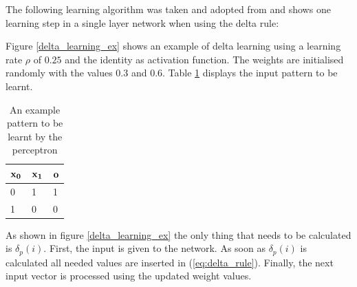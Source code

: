 The following learning algorithm was taken and adopted from \cite[p.186]{pattern} and shows one learning step in a single layer network when using the delta rule:

\begin{center}


\end{center}

Figure \ref{delta_learning_ex} shows an example of delta learning using a learning rate $\rho$ of $0.25$ and the identity as activation function. The weights are initialised randomly with the values 0.3 and 0.6. Table \ref{delta_ex_pattern} displays the input pattern to be learnt.

\begin{table}[htbp]
	\vspace{1.5em}
	\begin{center}
		\begin{tabular}{|l|l|l|}
		\hline
		$\bf{x_0}$&$\bf{x_1}$&$\bf{o}$\\
		\hline
		0&1&1\\
		\hline
		1&0&0\\
		\hline
		\end{tabular}
	\end{center}
	\vspace{-1em}
	\caption{An example pattern to be learnt by the perceptron}
	\vspace{1.5em}
	\label{delta_ex_pattern}
\end{table}

As shown in figure \ref{delta_learning_ex} the only thing that needs to be calculated is $\delta_p(i)$. First, the input is given to the network. As soon as $\delta_p(i)$ is calculated all needed values are inserted in (\ref{eq:delta_rule}). Finally, the next input vector is processed using the updated weight values.

